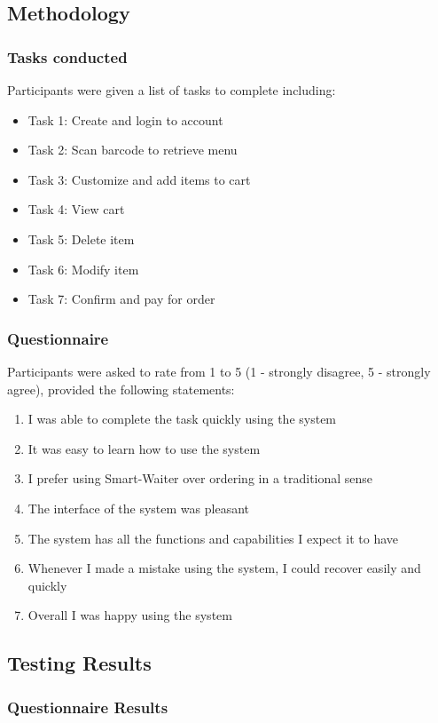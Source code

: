 \documentclass[12pt, titlepage]{article}
\begin{document}
\subsection{Methodology}

\subsubsection{Tasks conducted}
Participants were given a list of tasks to complete including: 
\begin{itemize}  
\item Task 1: Create and login to account
\item Task 2: Scan barcode to retrieve menu
\item Task 3: Customize and add items to cart
\item Task 4: View cart
\item Task 5: Delete item
\item Task 6: Modify item
\item Task 7: Confirm and pay for order
\end{itemize}
\subsubsection{Questionnaire}
Participants were asked to rate from 1 to 5 (1 - strongly disagree, 5 - strongly agree), provided the following statements: 
\begin{enumerate}
\item  I was able to complete the task quickly using the system
\item It was easy to learn how to use the system
\item I prefer using Smart-Waiter over ordering in a traditional sense
\item The interface of the system was pleasant
\item The system has all the functions and capabilities I expect it to have
\item Whenever I made a mistake using the system, I could recover easily and quickly
\item Overall I was happy using the system
\end{enumerate} 

\subsection{Testing Results} 

\subsubsection{Questionnaire Results}
\end{document}
